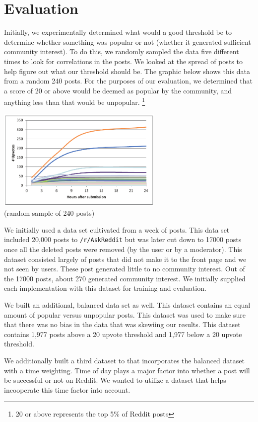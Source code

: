 \documentclass{acm_proc_article-sp}
\begin{document}
\section{Evaluation}
Initially, we experimentally determined what would a good threshold be to determine whether something was popular or not (whether it generated sufficient community interest). To do this, we randomly sampled the data five different times to look for correlations in the posts. We looked at the spread of posts to help figure out what our threshold should be. The graphic below shows this data from a random 240 posts. For the purposes of our evaluation, we determined that a score of 20 or above would be deemed as popular by the community, and anything less than that would be unpopular. \footnote{20 or above represents the top 5\% of Reddit posts}

\includegraphics[width=8cm]{evaluation.pdf}\\
(random sample of 240 posts)

We initially used a data set cultivated from a week of posts. This data set included 20,000 posts to \texttt{/r/AskReddit} but was later cut down to 17000 posts once all the deleted posts were removed (by the user or by a moderator). This dataset consisted largely of posts that did not make it to the front page and we not seen by users. These post generated little to no community interest. Out of the 17000 posts, about 270 generated community interest. We initially supplied each implementation with this dataset for training and evaluation.

We built an additional, balanced data set as well. This dataset contains an equal amount of popular versus unpopular posts. This dataset was used to make sure that there was no bias in the data that was skewiing our results. This dataset contains 1,977 posts above a 20 upvote threshold and 1,977 below a 20 upvote threshold.

We additionally built a third dataset to that incorporates the balanced dataset with a time weighting. Time of day plays a major factor into whether a post will be successful or not on Reddit. We wanted to utilize a dataset that helps incooperate this time factor into account. 
\end{document}
